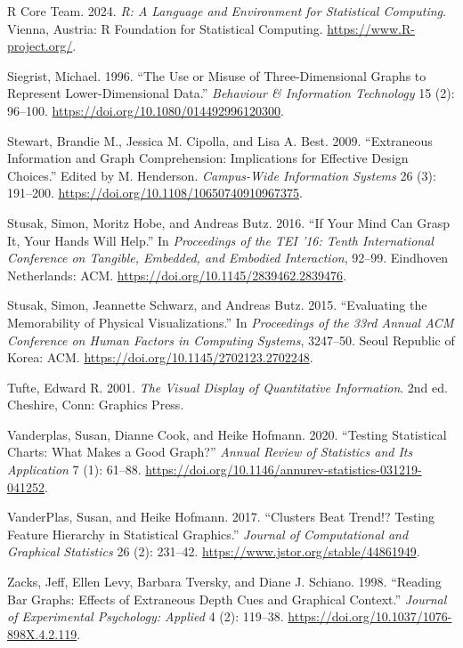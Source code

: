 \documentclass[phd]{nuthesis}
\begin{document}
\begin{CSLReferences}{1}{0}
R Core Team. 2024. \emph{R: A Language and Environment for Statistical
Computing}. Vienna, Austria: R Foundation for Statistical Computing.
\url{https://www.R-project.org/}.

Siegrist, Michael. 1996. {``The Use or Misuse of Three-Dimensional
Graphs to Represent Lower-Dimensional Data.''} \emph{Behaviour \&
Information Technology} 15 (2): 96--100.
\url{https://doi.org/10.1080/014492996120300}.

Stewart, Brandie M., Jessica M. Cipolla, and Lisa A. Best. 2009.
{``Extraneous Information and Graph Comprehension: Implications for
Effective Design Choices.''} Edited by M. Henderson. \emph{Campus-Wide
Information Systems} 26 (3): 191--200.
\url{https://doi.org/10.1108/10650740910967375}.

Stusak, Simon, Moritz Hobe, and Andreas Butz. 2016. {``If {Your Mind Can
Grasp It}, {Your Hands Will Help}.''} In \emph{Proceedings of the {TEI}
'16: {Tenth International Conference} on {Tangible}, {Embedded}, and
{Embodied Interaction}}, 92--99. Eindhoven Netherlands: ACM.
\url{https://doi.org/10.1145/2839462.2839476}.

Stusak, Simon, Jeannette Schwarz, and Andreas Butz. 2015. {``Evaluating
the {Memorability} of {Physical Visualizations}.''} In \emph{Proceedings
of the 33rd {Annual ACM Conference} on {Human Factors} in {Computing
Systems}}, 3247--50. Seoul Republic of Korea: ACM.
\url{https://doi.org/10.1145/2702123.2702248}.

Tufte, Edward R. 2001. \emph{The Visual Display of Quantitative
Information}. 2nd ed. Cheshire, Conn: Graphics Press.

Vanderplas, Susan, Dianne Cook, and Heike Hofmann. 2020. {``Testing
Statistical Charts: What Makes a Good Graph?''} \emph{Annual Review of
Statistics and Its Application} 7 (1): 61--88.
\url{https://doi.org/10.1146/annurev-statistics-031219-041252}.

VanderPlas, Susan, and Heike Hofmann. 2017. {``Clusters Beat Trend!?
Testing Feature Hierarchy in Statistical Graphics.''} \emph{Journal of
Computational and Graphical Statistics} 26 (2): 231--42.
\url{https://www.jstor.org/stable/44861949}.

Zacks, Jeff, Ellen Levy, Barbara Tversky, and Diane J. Schiano. 1998.
{``Reading Bar Graphs: Effects of Extraneous Depth Cues and Graphical
Context.''} \emph{Journal of Experimental Psychology: Applied} 4 (2):
119--38. \url{https://doi.org/10.1037/1076-898X.4.2.119}.

\end{CSLReferences}
\end{document}

